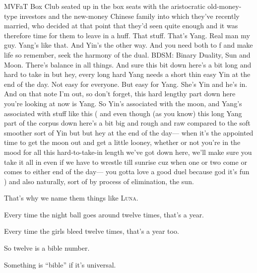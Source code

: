 {{{{				MVFaT Box Club seated up in the box seats with the aristocratic
				old-money-type investors and the new-money Chinese family into
				which they've recently married, who decided at that point that
				they'd seen quite enough and it was therefore time for them to
				leave in a huff.
				That stuff.
				That's Yang.
				Real man  my guy.
				Yang's like that.
				And Yin's the other way.
				And you need both to 
				f and make life
				so remember, seek the harmony of the dual.
				BDSM: Binary Duality, Sun and Moon. There's balance in all things.
				And sure this bit down here's a bit long and hard to take in but hey,
				every long hard Yang needs a short thin easy Yin at the end of the day.
				Not easy for everyone. But easy for Yang. She's Yin and he's in.
				And on that note I'm out, so don't forget, this hard lengthy part
				down here you're looking at now is Yang.
				So Yin's associated with the moon, and Yang's associated with stuff like this
				(%
					and even though (as you know) this long Yang part of the
					corpus down here's a bit big and rough and raw compared to
					the soft smoother sort of Yin
					but but hey at the end of the day---%
					when it's the appointed time to get the moon out and get a little looney,
					whether or not you're in the mood for all this hard-to-take-in length
					we've got down here, we'll make sure you take it all in even if we have
					to wrestle till sunrise cuz when one or two come or comes to either end of the day---%
					you gotta love a good duel because god
					 it's fun%
				)
				and also naturally, sort of by process of elimination, the sun.%
					{\!\!}
				}}

                That's why we name them things like \textsc{Luna}.

                Every time the night ball goes around twelve times, that's a year.

                Every time the girls bleed twelve times, that's a year too.

                So twelve is a bible number.

                Something is ``bible'' if it's universal.

}}
